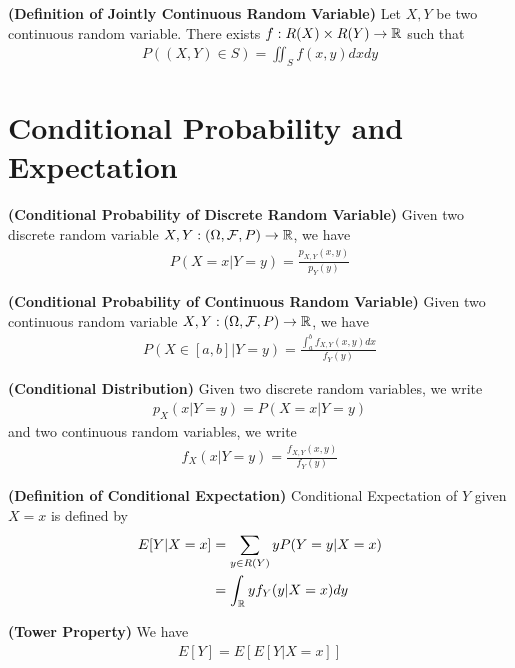 \documentclass{report}
\begin{document}
\begin{definition}
\label{4.1.5}
\textbf{(Definition of Jointly Continuous Random Variable)} Let $X,Y$ be two continuous random variable. There exists  $f:R(X)\times R(Y)\rightarrow \mathbb{R}$ such that 
\begin{align*}
P((X,Y)\in S)=\iint_S f(x,y) dxdy
\end{align*}
\end{definition}
\section{Conditional Probability and Expectation}
\begin{theorem}
\label{4.2.1}
\textbf{(Conditional Probability of Discrete Random Variable)} Given two discrete random variable  $X,Y:(\Omega,\mathcal{F},P)\rightarrow \mathbb{R}$, we have 
\begin{align*}
P(X=x|Y=y)=\frac{p_{X,Y}(x,y)}{p_{Y}(y)}
\end{align*}
\end{theorem}
\begin{theorem}
\label{4.2.2}
\textbf{(Conditional Probability of Continuous Random Variable)} Given two continuous random variable $X,Y:(\Omega,\mathcal{F},P)\rightarrow \mathbb{R}$, we have 
\begin{align*}
P(X\in [a,b]|Y=y)=\frac{\int_a^b f_{X,Y}(x,y)dx}{f_{Y}(y)}
\end{align*}
\end{theorem}
\begin{definition}
\label{4.2.3}
\textbf{(Conditional Distribution)} Given two discrete random variables, we write 
\begin{align*}
p_X(x|Y=y)=P(X=x|Y=y)
\end{align*}
and two continuous random variables, we write 
\begin{align*}
f_X(x|Y=y)=\frac{f_{X,Y}(x,y)}{f_Y(y)}
\end{align*}
\end{definition}
\begin{definition}
\label{4.2.4}
\textbf{(Definition of Conditional Expectation)} Conditional Expectation of $Y$ given  $X=x$ is defined by 
 \begin{align*}
E[Y|X=x]&=\sum_{y \in R(Y)}y P(Y=y|X=x)\\
&=\int_{\mathbb{R}} y f_{Y}(y|X=x)dy
\end{align*}
\end{definition}
\begin{theorem}
\textbf{(Tower Property)} We have 
\begin{align*}
E[Y]=E[E[Y|X=x]]
\end{align*}
\end{theorem}
\end{document}
